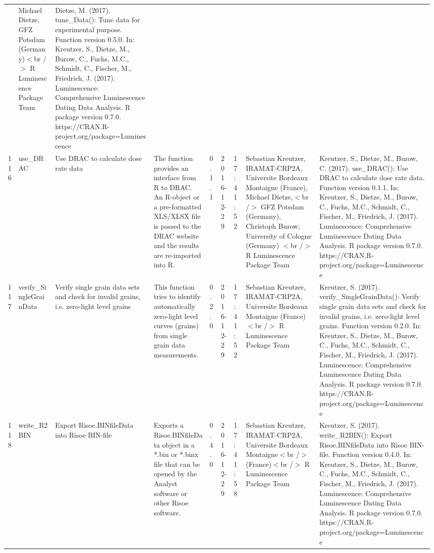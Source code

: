 \begin{table}[ht]
\begin{tabular}{rllllllll}
 & Michael Dietze, GFZ Potsdam (Germany)$<$br /$>$  R Luminescence Package Team & Dietze, M. (2017). tune\_Data(): Tune data for experimental purpose. Function version 0.5.0. In: Kreutzer, S., Dietze, M., Burow, C., Fuchs, M.C., Schmidt, C., Fischer, M., Friedrich, J. (2017). Luminescence: Comprehensive Luminescence Dating Data Analysis. R package version 0.7.0. https://CRAN.R-project.org/package=Luminescence
 \\ 
  116 & use\_DRAC & Use DRAC to calculate dose rate data & The function provides an interface from R to DRAC. An R-object or a pre-formatted XLS/XLSX file is passed to the DRAC website and the results are re-imported into R. & 0.1.1 & 2016-12-29 & 17:41:52
 & Sebastian Kreutzer, IRAMAT-CRP2A, Universite Bordeaux Montaigne (France), Michael Dietze,$<$br /$>$ GFZ Potsdam (Germany), Christoph Burow, University of Cologne (Germany) $<$br /$>$  R Luminescence Package Team & Kreutzer, S., Dietze, M., Burow, C. (2017). use\_DRAC(): Use DRAC to calculate dose rate data. Function version 0.1.1. In: Kreutzer, S., Dietze, M., Burow, C., Fuchs, M.C., Schmidt, C., Fischer, M., Friedrich, J. (2017). Luminescence: Comprehensive Luminescence Dating Data Analysis. R package version 0.7.0. https://CRAN.R-project.org/package=Luminescence
 \\ 
  117 & verify\_SingleGrainData & Verify single grain data sets and check for invalid grains, i.e. zero-light level grains & This function tries to identify automatically zero-light level curves (grains) from single grain data measurements. & 0.2.0 & 2016-12-29 & 17:41:52
 & Sebastian Kreutzer, IRAMAT-CRP2A, Universite Bordeaux Montaigne (France)$<$br /$>$  R Luminescence Package Team & Kreutzer, S. (2017). verify\_SingleGrainData(): Verify single grain data sets and check for invalid grains, i.e. zero-light level grains. Function version 0.2.0. In: Kreutzer, S., Dietze, M., Burow, C., Fuchs, M.C., Schmidt, C., Fischer, M., Friedrich, J. (2017). Luminescence: Comprehensive Luminescence Dating Data Analysis. R package version 0.7.0. https://CRAN.R-project.org/package=Luminescence
 \\ 
  118 & write\_R2BIN & Export Risoe.BINfileData into Risoe BIN-file & Exports a Risoe.BINfileData object in a *.bin or *.binx file that can be opened by the Analyst software or other Risoe software. & 0.4.0 & 2016-12-29 & 17:41:58
 & Sebastian Kreutzer, IRAMAT-CRP2A, Universite Bordeaux Montaigne$<$br /$>$ (France)$<$br /$>$  R Luminescence Package Team & Kreutzer, S. (2017). write\_R2BIN(): Export Risoe.BINfileData into Risoe BIN-file. Function version 0.4.0. In: Kreutzer, S., Dietze, M., Burow, C., Fuchs, M.C., Schmidt, C., Fischer, M., Friedrich, J. (2017). Luminescence: Comprehensive Luminescence Dating Data Analysis. R package version 0.7.0. https://CRAN.R-project.org/package=Luminescence

\end{tabular}
\end{table}
